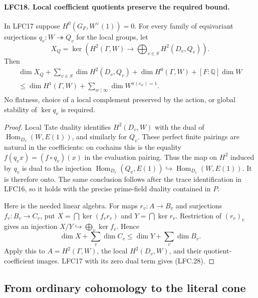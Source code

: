 \documentclass[11pt,a4paper]{article}
\numberwithin{equation}{section}
\theoremstyle{remark}\newtheorem{remark}[theorem]{Remark}
\begin{document}
\paragraph{LFC18. Local coefficient quotients preserve the required bound.}
\label{claim:LFC18}
In LFC17 suppose \(H^0(G_F,W^\vee(1))=0\).
For every family of equivariant surjections
\(q_v:W\twoheadrightarrow Q_v\) for the local groups,
let
\[
 X_Q=\ker\left(H^2(\Gamma,W)\longrightarrow
                              \bigoplus_{v\in S}H^2(D_v,Q_v)\right).
 \]
Then
\[
 \begin{split}
 \dim X_Q+\sum_{v\in S}\dim H^2(D_v,Q_v)
       +\dim H^0(\Gamma,W)+[F:\mathbb Q]\dim W\\
 \le \dim H^1(\Gamma,W)
       +\sum_{w\mid\infty}\dim W^{\pi(c_w)=1}.
 \end{split}                                           \tag{LFC.28}
\]
No flatness, choice of a local complement preserved by
the action, or global stability of \(\ker q_v\) is required.

\begin{proof}
Local Tate duality identifies \(H^2(D_v,W)\) with the
dual of \(\operatorname{Hom}_{D_v}(W,E(1))\), and similarly
for \(Q_v\).  These perfect finite pairings are natural
in the coefficients: on cochains this is the equality
\(f(q_v x)=(f\circ q_v)(x)\) in the evaluation pairing.
Thus the map on \(H^2\) induced by \(q_v\) is dual to the
injection
\(\operatorname{Hom}_{D_v}(Q_v,E(1))
 \hookrightarrow\operatorname{Hom}_{D_v}(W,E(1))\).
It is therefore onto.  The same conclusion follows after
the trace identification in LFC16, so it holds with the
precise prime-field duality contained in \(P\).

Here is the needed linear algebra.  For maps
\(r_v:A\to B_v\) and surjections \(f_v:B_v\to C_v\),
put \(X=\bigcap\ker(f_vr_v)\) and \(Y=\bigcap\ker r_v\).
Restriction of \((r_v)_v\) gives an injection
\(X/Y\hookrightarrow\bigoplus_v\ker f_v\).
Hence
\[
          \dim X+\sum_v\dim C_v
                   \le\dim Y+\sum_v\dim B_v.
 \]
Apply this to \(A=H^2(\Gamma,W)\), the local
\(H^2(D_v,W)\), and their quotient-coefficient images.
LFC17 with its zero dual term gives (LFC.28).
\end{proof}

\subsection{From ordinary cohomology to the literal cone}
\end{document}
